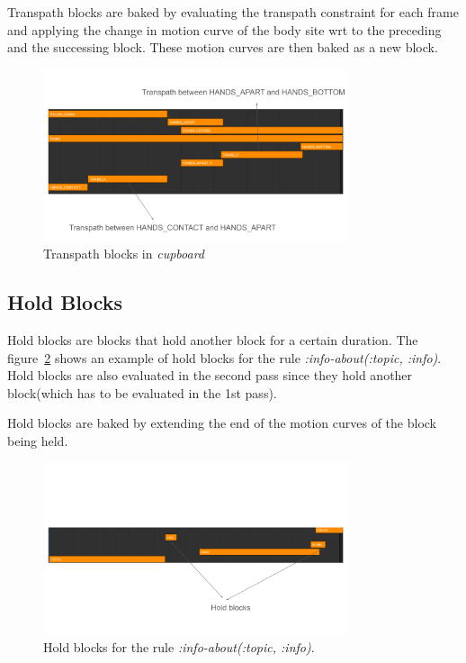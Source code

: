 \documentclass[../../main.tex]{subfiles}
\begin{document}
Transpath blocks are baked by evaluating the transpath constraint for each frame and applying the change in motion curve of the body site wrt to the preceding and the successing block. These motion curves are then baked as a new block.

\begin{figure}[h]
    \centering
    \includegraphics[width=0.8\textwidth]{chapters/multi_track/images/transpath_blocks.png}
    \caption{Transpath blocks in \emph{cupboard}}
    \label{fig:transpath_blocks}
\end{figure}

\subsection{Hold Blocks}
\label{ch:multi_track:second_pass:hold_blocks}

Hold blocks are blocks that hold another block for a certain duration. The figure~\ref{fig:hold_blocks} shows an example of hold blocks for the rule \emph{:info-about(:topic, :info)}. Hold blocks are also evaluated in the second pass since they hold another block(which has to be evaluated in the 1st pass).

Hold blocks are baked by extending the end of the motion curves of the block being held.

\begin{figure}
    \centering
    \includegraphics[width=0.8\textwidth]{chapters/multi_track/images/hold_blocks.png}
    \caption{Hold blocks for the rule \emph{:info-about(:topic, :info)}.}
    \label{fig:hold_blocks}
\end{figure}
\end{document}
